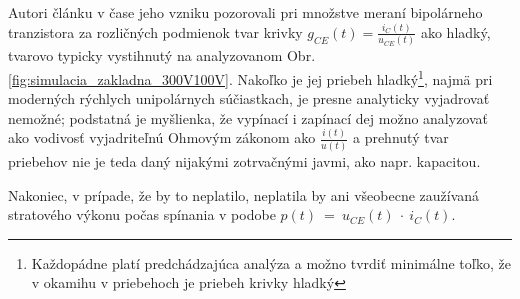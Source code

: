 Autori článku \cite{valsa-patocka-petru} v čase jeho vzniku pozorovali pri množstve meraní bipolárneho tranzistora za rozličných podmienok tvar krivky $g_{CE}(t) = \frac{i_C(t)}{u_{CE}(t)}$ ako hladký, tvarovo typicky vystihnutý na analyzovanom Obr. \ref{fig:simulacia_zakladna_300V100V}. Nakoľko je jej priebeh hladký\footnote{Každopádne platí predchádzajúca analýza a možno tvrdiť minimálne toľko, že v okamihu  v priebehoch je priebeh krivky hladký}, najmä pri moderných rýchlych unipolárnych súčiastkach, je presne analyticky vyjadrovať nemožné; podstatná je myšlienka, že vypínací i zapínací dej možno analyzovať ako  vodivosť vyjadriteľnú Ohmovým zákonom ako $\frac{i(t)}{u(t)}$ a prehnutý tvar priebehov nie je teda daný nijakými zotrvačnými javmi, ako napr. kapacitou.

Nakoniec, v prípade, že by to neplatilo, neplatila by ani všeobecne zaužívaná  stratového výkonu počas spínania v podobe $p(t)~=~u_{CE}(t)~\cdot~i_C(t)$.

